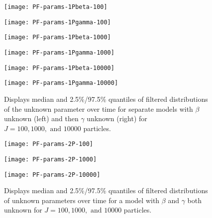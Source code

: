 \documentclass{article}
\begin{document}
\begin{figure}[ht]
\centering
\begin{minipage}{0.45\linewidth}
\texttt{[image: PF-params-1Pbeta-100]}
\end{minipage}
\begin{minipage}{0.45\linewidth}
\texttt{[image: PF-params-1Pgamma-100]}
\end{minipage}
\begin{minipage}{0.45\linewidth}
\texttt{[image: PF-params-1Pbeta-1000]}
\end{minipage}
\begin{minipage}{0.45\linewidth}
\texttt{[image: PF-params-1Pgamma-1000]}
\end{minipage}
\begin{minipage}{0.45\linewidth}
\texttt{[image: PF-params-1Pbeta-10000]}
\end{minipage}
\begin{minipage}{0.45\linewidth}
\texttt{[image: PF-params-1Pgamma-10000]}
\end{minipage}
\caption{Displays median and 2.5\%/97.5\% quantiles of filtered distributions of the unknown parameter over time for separate models with $\beta$ unknown (left) and then $\gamma$ unknown (right) for $J = 100, 1000, \mbox{ and } 10000$ particles.}
\end{figure}

\begin{figure}[ht]
\begin{minipage}{1.0\linewidth}
\texttt{[image: PF-params-2P-100]}
\end{minipage}
\begin{minipage}{1.0\linewidth}
\texttt{[image: PF-params-2P-1000]}
\end{minipage}
\begin{minipage}{1.0\linewidth}
\texttt{[image: PF-params-2P-10000]}
\end{minipage}
\caption{Displays median and 2.5\%/97.5\% quantiles of filtered distributions of unknown parameters over time for a model with $\beta$ and $\gamma$ both unknown for $J = 100, 1000, \mbox{ and } 10000$ particles.}
\end{figure}
\end{document}
